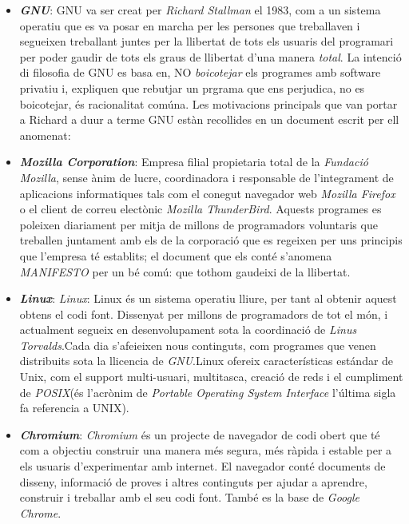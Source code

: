 \begin{itemize}

\item \textbf{\emph{GNU}}: GNU va ser creat per \textit{Richard Stallman} el 1983, com a un sistema operatiu que es va posar en marcha per les persones que treballaven i segueixen treballant juntes per la llibertat de tots els usuaris del programari per poder gaudir de tots els graus de llibertat d'una manera \textit{total}. La intenció di filosofia de GNU es basa en, NO \textit{boicotejar} els programes amb software privatiu i, expliquen que rebutjar un prgrama que ens perjudica, no es boicotejar, és racionalitat comúna. Les motivacions principals que van portar a Richard a duur a terme GNU estàn recollides en un document escrit per ell anomenat: \cite{GNUExit} \cite{GNUExitII} \cite{GNUMan} \cite{GvsM}

\item \textbf{\emph{Mozilla Corporation}}: Empresa filial propietaria total de la \emph{Fundació Mozilla}, sense ànim de lucre, coordinadora i responsable de l'integrament de aplicacions informatiques tals com el conegut navegador web \textit{Mozilla Firefox} o el client de correu electònic \textit{Mozilla ThunderBird}. Aquests programes es poleixen diariament per mitja de millons de programadors voluntaris que treballen juntament amb els de la corporació que es regeixen per uns principis que l'empresa té establits; el document que els conté s'anomena \emph{MANIFESTO} per un bé comú: que tothom gaudeixi de la llibertat. \cite{MozExit} \cite{MozExitII} \cite{MozFesto}

\item \textbf{\emph{Linux}}: \emph{Linux}: Linux és un sistema operatiu lliure, per tant al obtenir aquest obtens el codi font. Dissenyat per millons de programadors de tot el món, i actualment segueix en desenvolupament sota la coordinació de \emph{Linus Torvalds}.Cada dia s'afeieixen nous continguts, com programes que venen distribuits sota la llicencia de \emph{GNU}.Linux ofereix características estándar de Unix, com el support multi-usuari, multitasca, creació de reds i el cumpliment de \emph{POSIX}(és l'acrònim de \emph{Portable Operating System Interface} l'última sigla fa referencia a UNIX). \cite{LinExit} \cite{POSIX}

\item \textbf{\emph{Chromium}}: \emph{Chromium} és un projecte de navegador de codi obert que té com a objectiu construir una manera més segura, més ràpida i estable per a els usuaris d'experimentar amb internet. El navegador conté documents de disseny, informació de proves i altres continguts per ajudar a aprendre, construir i treballar amb el seu codi font. També es la base de \textit{Google Chrome}. \cite{Chrom} 

\end{itemize}





